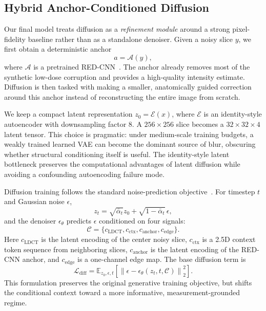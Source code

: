 \documentclass{article}
\begin{document}
\subsection{Hybrid Anchor-Conditioned Diffusion}
Our final model treats diffusion as a \emph{refinement module} around a strong pixel-fidelity baseline rather than as a standalone denoiser. Given a noisy slice $y$, we first obtain a deterministic anchor
\begin{equation}
    a = \mathcal{A}(y),
\end{equation}
where $\mathcal{A}$ is a pretrained RED-CNN~\cite{chen2017}. The anchor already removes most of the synthetic low-dose corruption and provides a high-quality intensity estimate. Diffusion is then tasked with making a smaller, anatomically guided correction around this anchor instead of reconstructing the entire image from scratch.

We keep a compact latent representation $z_0 = \mathcal{E}(x)$, where $\mathcal{E}$ is an identity-style autoencoder with downsampling factor $8$. A $256 \times 256$ slice becomes a $32 \times 32 \times 4$ latent tensor. This choice is pragmatic: under medium-scale training budgets, a weakly trained learned VAE can become the dominant source of blur, obscuring whether structural conditioning itself is useful. The identity-style latent bottleneck preserves the computational advantages of latent diffusion while avoiding a confounding autoencoding failure mode.

Diffusion training follows the standard noise-prediction objective~\cite{ho2020}. For timestep $t$ and Gaussian noise $\epsilon$,
\begin{equation}
    z_t = \sqrt{\bar{\alpha}_t} z_0 + \sqrt{1-\bar{\alpha}_t}\,\epsilon,
\end{equation}
and the denoiser $\epsilon_{\theta}$ predicts $\epsilon$ conditioned on four signals:
\begin{equation}
    \mathcal{C} = \{c_{\text{LDCT}}, c_{\text{ctx}}, c_{\text{anchor}}, c_{\text{edge}}\}.
\end{equation}
Here $c_{\text{LDCT}}$ is the latent encoding of the center noisy slice, $c_{\text{ctx}}$ is a 2.5D context token sequence from neighboring slices, $c_{\text{anchor}}$ is the latent encoding of the RED-CNN anchor, and $c_{\text{edge}}$ is a one-channel edge map. The base diffusion term is
\begin{equation}
    \mathcal{L}_{\text{diff}} =
    \mathbb{E}_{z_0,\epsilon,t}\left[\left\| \epsilon - \epsilon_{\theta}(z_t, t, \mathcal{C}) \right\|_2^2\right].
\end{equation}
This formulation preserves the original generative training objective, but shifts the conditional context toward a more informative, measurement-grounded regime.
\end{document}
